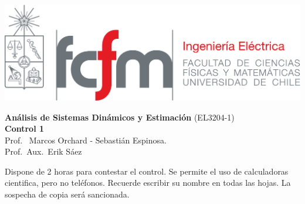 \documentclass[
  11pt,
  letterpaper,
   addpoints,
   answers
  ]{exam}
\begin{document}
\noindent
\begin{minipage}{0.47\textwidth}
\includegraphics[width=\textwidth]{../fcfm_die}
\end{minipage}
\begin{minipage}{0.53\textwidth}
\begin{center} 
\large\textbf{Análisis de Sistemas Dinámicos y Estimación} (EL3204-1) \\
\large\textbf{Control 1} \\
\normalsize Prof.~ Marcos Orchard - Sebastián Espinosa.\\
\normalsize Prof.~Aux.~Erik Sáez
\end{center}
\end{minipage}

\begin{tcolorbox}[colback=yellow!10!white,colframe=black!80!white,title=Instrucciones]
Dispone de 2 horas para contestar el control. Se permite el uso de calculadoras cientifica, pero no teléfonos. Recuerde escribir su nombre en todas las hojas. La sospecha de copia será sancionada.
\end{tcolorbox}
\end{document}
